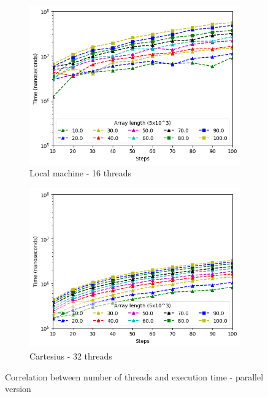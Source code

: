 \documentclass[a4paper]{article}
\begin{document}
\begin{figure}[htbp]
\begin{subfigure}{.42\textwidth}
  \includegraphics[width=\linewidth]{res/parallel/array_thread_16_steps_res.png}
  \caption{Local machine - 16 threads}
  \label{subfig:steps_thread16_parall}
\end{subfigure}%
\begin{subfigure}{.42\textwidth}
  \centering
  \includegraphics[width=\linewidth]{res/parallel/array_thread_16_steps_res_cartesius.png}
  \caption{Cartesius - 32 threads}
  \label{subfig:steps_thread16_parall_cart}
\end{subfigure}
\caption{Correlation between number of threads and execution time - parallel version}
\label{fig:steps_parall}
\end{figure}
\end{document}
